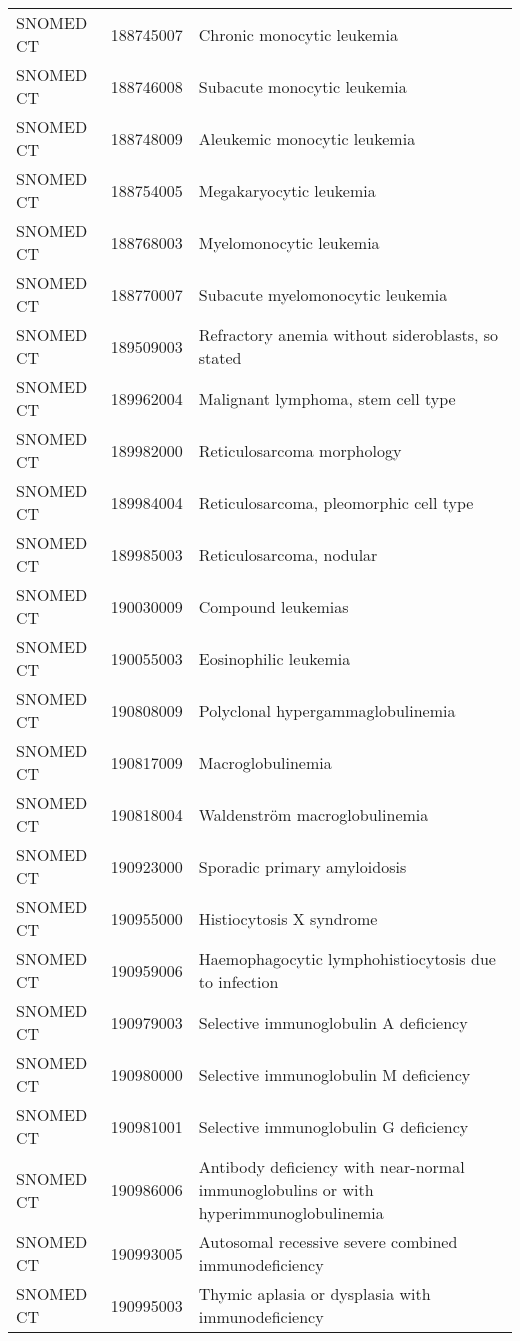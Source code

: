 \begin{table}[ht]
\begin{tabular}{lll}
  SNOMED CT & 188745007 & Chronic monocytic leukemia \\ 
  SNOMED CT & 188746008 & Subacute monocytic leukemia \\ 
  SNOMED CT & 188748009 & Aleukemic monocytic leukemia \\ 
  SNOMED CT & 188754005 & Megakaryocytic leukemia \\ 
  SNOMED CT & 188768003 & Myelomonocytic leukemia \\ 
  SNOMED CT & 188770007 & Subacute myelomonocytic leukemia \\ 
  SNOMED CT & 189509003 & Refractory anemia without sideroblasts, so stated \\ 
  SNOMED CT & 189962004 & Malignant lymphoma, stem cell type \\ 
  SNOMED CT & 189982000 & Reticulosarcoma morphology \\ 
  SNOMED CT & 189984004 & Reticulosarcoma, pleomorphic cell type \\ 
  SNOMED CT & 189985003 & Reticulosarcoma, nodular \\ 
  SNOMED CT & 190030009 & Compound leukemias \\ 
  SNOMED CT & 190055003 & Eosinophilic leukemia \\ 
  SNOMED CT & 190808009 & Polyclonal hypergammaglobulinemia \\ 
  SNOMED CT & 190817009 & Macroglobulinemia \\ 
  SNOMED CT & 190818004 & Waldenström macroglobulinemia \\ 
  SNOMED CT & 190923000 & Sporadic primary amyloidosis \\ 
  SNOMED CT & 190955000 & Histiocytosis X syndrome \\ 
  SNOMED CT & 190959006 & Haemophagocytic lymphohistiocytosis due to infection \\ 
  SNOMED CT & 190979003 & Selective immunoglobulin A deficiency \\ 
  SNOMED CT & 190980000 & Selective immunoglobulin M deficiency \\ 
  SNOMED CT & 190981001 & Selective immunoglobulin G deficiency \\ 
  SNOMED CT & 190986006 & Antibody deficiency with near-normal immunoglobulins or with hyperimmunoglobulinemia \\ 
  SNOMED CT & 190993005 & Autosomal recessive severe combined immunodeficiency \\ 
  SNOMED CT & 190995003 & Thymic aplasia or dysplasia with immunodeficiency \\ 

\end{tabular}
\end{table}
